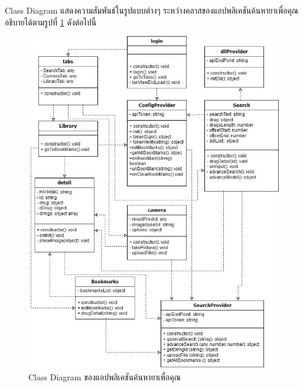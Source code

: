 
	Class Diagram แสดงความสัมพันธ์ในรูปแบบต่างๆ ระหว่างคลาสของแอปพลิเคชันค้นหายาเพื่อคุณ อธิบายได้ตามรูปที่ \ref{Fig:class} ดังต่อไปนี้

	\begin{figure}[H]
		\includegraphics[width=\columnwidth]{Figures/3/class}
		\caption{Class Diagram ของแอปพลิเคชันค้นหายาเพื่อคุณ}
		\label{Fig:class}
	\end{figure}

